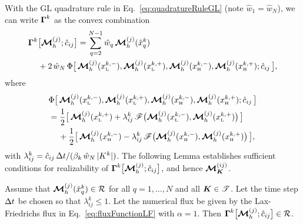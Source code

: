 With the GL quadrature rule in Eq.~\eqref{eq:quadratureRuleGL} (note $\hat{w}_{1}=\hat{w}_{N}$), we can write $\boldsymbol{\Gamma}^{k}$ as the convex combination
\begin{align}
  &\boldsymbol{\Gamma}^{k}\big[\boldsymbol{\mathcal{M}}_{h}^{(j)};\hat{c}_{ij}\big]
  =\sum_{q=2}^{N-1}\hat{w}_{q}\,\boldsymbol{\mathcal{M}}_{h}^{(j)}(\hat{x}_{q}^{k}) \nonumber \\
  &\hspace{12pt}
  +2\,\hat{w}_{N}\,
  \Phi\big[\,\boldsymbol{\mathcal{M}}_{h}^{(j)}(x_{\mbox{\tiny L}}^{k,-}),\boldsymbol{\mathcal{M}}_{h}^{(j)}(x_{\mbox{\tiny L}}^{k,+}),\boldsymbol{\mathcal{M}}_{h}^{(j)}(x_{\mbox{\tiny H}}^{k,-}),\boldsymbol{\mathcal{M}}_{h}^{(j)}(x_{\mbox{\tiny H}}^{k,+});\hat{c}_{ij}\,\big],
  \label{eq:realizableGammaConvex}
\end{align}
where
\begin{align}
  &\Phi\big[\,\boldsymbol{\mathcal{M}}_{h}^{(j)}(x_{\mbox{\tiny L}}^{k,-}),\boldsymbol{\mathcal{M}}_{h}^{(j)}(x_{\mbox{\tiny L}}^{k,+}),\boldsymbol{\mathcal{M}}_{h}^{(j)}(x_{\mbox{\tiny H}}^{k,-}),\boldsymbol{\mathcal{M}}_{h}^{(j)}(x_{\mbox{\tiny H}}^{k,+});\hat{c}_{ij}\,\big] \nonumber \\
  &=\frac{1}{2}\big[\,\boldsymbol{\mathcal{M}}_{h}^{(j)}(x_{\mbox{\tiny L}}^{k,+})+\lambda_{ij}^{k}\,\mathscr{F}\big(\boldsymbol{\mathcal{M}}_{h}^{(j)}(x_{\mbox{\tiny L}}^{k,-}),\boldsymbol{\mathcal{M}}_{h}^{(j)}(x_{\mbox{\tiny L}}^{k,+})\big)\,\big] \nonumber \\
  &\hspace{12pt}
  +\frac{1}{2}\big[\,\boldsymbol{\mathcal{M}}_{h}^{(j)}(x_{\mbox{\tiny H}}^{k,-})-\lambda_{ij}^{k}\,\mathscr{F}\big(\boldsymbol{\mathcal{M}}_{h}^{(j)}(x_{\mbox{\tiny H}}^{k,-}),\boldsymbol{\mathcal{M}}_{h}^{(j)}(x_{\mbox{\tiny H}}^{k,+})\big)\,\big],
\end{align}
with $\lambda_{ij}^{k}=\hat{c}_{ij}\,\Delta t/(\beta_{k}\,\hat{w}_{N}\,|K^{k}|)$.  
The following Lemma establishes sufficient conditions for realizability of $\boldsymbol{\Gamma}^{k}\big[\boldsymbol{\mathcal{M}}_{h}^{(j)};\hat{c}_{ij}\big]$, and hence $\boldsymbol{\mathcal{M}}_{\boldsymbol{K}}^{(ij)}$.  
\begin{lemma}
  Assume that $\boldsymbol{\mathcal{M}}_{h}^{(j)}(\hat{x}_{q}^{k})\in\mathcal{R}$ for all $q=1,\ldots,N$ and all $\boldsymbol{K}\in\mathscr{T}$.  
  Let the time step $\Delta t$ be chosen so that $\lambda_{ij}^{k}\le1$.  
  Let the numerical flux be given by the Lax-Friedrichs flux in Eq.~\eqref{eq:fluxFunctionLF} with $\alpha=1$.  
  Then $\boldsymbol{\Gamma}^{k}\big[\boldsymbol{\mathcal{M}}_{h}^{(j)};\hat{c}_{ij}\big]\in\mathcal{R}$.  
  \label{lem:realizableGamma}
\end{lemma}
